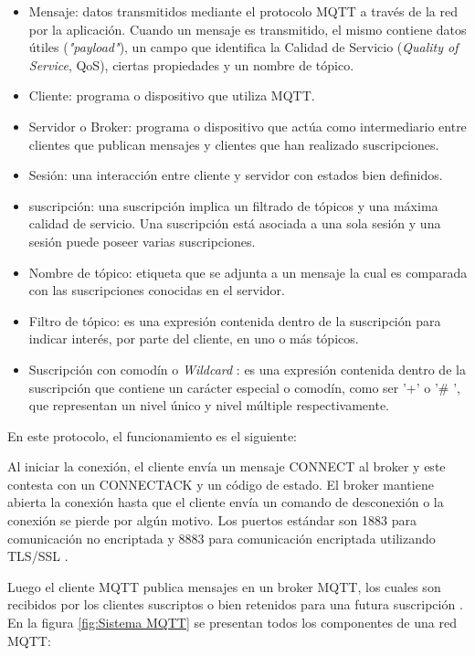 \begin{itemize}
\item Mensaje: datos transmitidos mediante el protocolo MQTT  a través de la red por la aplicación. Cuando un mensaje es transmitido, el mismo contiene datos útiles (\textit{"payload"}), un campo que identifica la Calidad de Servicio (\textit{Quality of Service}, QoS), ciertas propiedades y un nombre de tópico.
\item Cliente: programa o dispositivo que utiliza MQTT.
\item Servidor o Broker: programa o dispositivo que actúa como intermediario entre clientes que publican mensajes y clientes que han realizado suscripciones.
\item Sesión: una interacción entre cliente y servidor con estados bien definidos.
\item suscripción: una  suscripción implica un filtrado de tópicos y una máxima calidad de servicio. Una suscripción está asociada a una sola sesión y una sesión puede poseer varias suscripciones.
\item Nombre de tópico: etiqueta que se adjunta a un mensaje la cual es comparada con las suscripciones conocidas en el servidor.
\item Filtro de tópico: es una expresión contenida dentro de la suscripción para indicar interés, por parte del cliente, en uno o más tópicos.
\item Suscripción con comodín o \textit{Wildcard} : es una expresión contenida dentro de la suscripción que contiene un carácter especial o comodín, como ser '+' o '\# ', que representan un nivel único y nivel múltiple respectivamente.

\end{itemize}

En este protocolo, el funcionamiento es el siguiente: 

Al iniciar la conexión, el cliente envía un mensaje CONNECT al broker y este contesta con un CONNECTACK y un código de estado. El broker mantiene abierta la conexión hasta que el cliente envía un comando de desconexión o la conexión se pierde por algún motivo. Los puertos estándar son 1883 para comunicación no encriptada y 8883 para comunicación encriptada utilizando TLS/SSL \citep{ARTICLE:4}.

Luego el cliente MQTT publica mensajes en un broker MQTT, los cuales son recibidos por los clientes suscriptos o bien retenidos para una futura suscripción \citep{WEBSITE:5}. En la figura \ref{fig:Sistema MQTT} se presentan todos los componentes de una red MQTT:  

